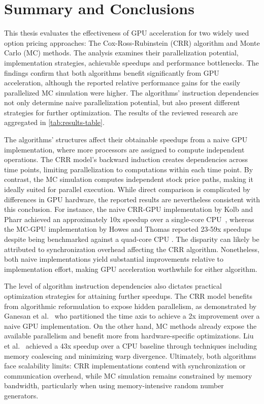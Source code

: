 \documentclass[english,12pt,a4paper,pdftex,sci,utf8]{aaltothesis}
\begin{document}
\section{Summary and Conclusions}  \label{sec:summary-conclusions}
This thesis evaluates the effectiveness of GPU acceleration for two widely used option pricing approaches: The Cox-Ross-Rubinstein (CRR) algorithm and Monte Carlo (MC) methods. The analysis examines their parallelization potential, implementation strategies, achievable speedups and performance bottlenecks. The findings confirm that both algorithms benefit significantly from GPU acceleration, although the reported relative performance gains for the easily parallelized MC simulation were higher. The algorithms' instruction dependencies not only determine naive parallelization potential, but also present different strategies for further optimization. The results of the reviewed research are aggregated in \cref{tab:results-table}.

The algorithms' structures affect their obtainable speedups from a naive GPU implementation, where more processors are assigned to compute independent operations. The CRR model's backward induction creates dependencies across time points, limiting parallelization to computations within each time point. By contrast, the MC simulation computes independent stock price paths, making it ideally suited for parallel execution. While direct comparison is complicated by differences in GPU hardware, the reported results are nevertheless consistent with this conclusion. For instance, the naive CRR-GPU implementation by Kolb and Pharr achieved an approximately 10x speedup over a single-core CPU~\cite{pharr2005gpu}, whereas the MC-GPU implementation by Howes and Thomas reported 23-59x speedups despite being benchmarked against a quad-core CPU \cite{nguyen2007gpu}. The disparity can likely be attributed to synchronization overhead affecting the CRR algorithm. Nonetheless, both naive implementations yield substantial improvements relative to implementation effort, making GPU acceleration worthwhile for either algorithm. 

The level of algorithm instruction dependencies also dictates practical optimization strategies for attaining further speedups. The CRR model benefits from algorithmic reformulation to expose hidden parallelism, as demonstrated by Ganesan et al.\ \cite{ganesan2009acceleration} who partitioned the time axis to achieve a 2x improvement over a naive GPU implementation. On the other hand, MC methods already expose the available parallelism and benefit more from hardware-specific optimizations. Liu et al.\ \cite{liu2010efficient} achieved a 43x speedup over a CPU baseline through techniques including memory coalescing and minimizing warp divergence. Ultimately, both algorithms face scalability limits: CRR implementations contend with synchronization or communication overhead, while MC simulation remains constrained by memory bandwidth, particularly when using memory-intensive random number generators.
\end{document}

